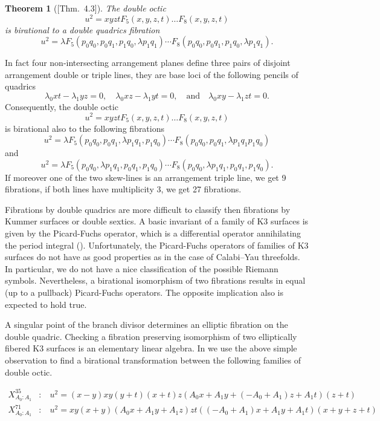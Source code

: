 \documentclass[12pt]{amsart}
\theoremstyle{plain}
\newtheorem{theorem}{Theorem}[section]
\theoremstyle{remark}
\theoremstyle{definition}
\numberwithin{table}{section}
\begin{document}
\begin{theorem}[\mbox{\cite{CK-C2}[Thm.~4.3]}]
	The double octic
	\[u^{2} = xyztF_{5}(x,y,z,t)\dots F_{8}(x,y,z,t)\]
	is birational to a double quadrics fibration
	\[u^{2} = \lambda F_{5}(p_{0}q_{0}, p_{0}q_{1}, p_{1}q_{0}, \lambda p_{1}q_{1}) \cdots F_{8}(p_{0}q_{0}, p_{0}q_{1}, p_{1}q_{0}, \lambda p_{1}q_{1}).\]
\end{theorem}
In fact four non-intersecting arrangement planes define three pairs of disjoint arrangement double or triple lines, they are base loci of the following pencils of quadrics
\[\lambda_{0}xt-\lambda_{1}yz=0, \quad \lambda_{0}xz-\lambda_{1}yt=0, \quad\text{and} \quad \lambda_{0}xy-\lambda_{1}zt=0.\]
Consequently, the double octic
	\[u^{2} = xyztF_{5}(x,y,z,t)\dots F_{8}(x,y,z,t)\]
is birational also to the following fibrations
\[u^{2} = \lambda F_{5}(p_{0}q_{0}, p_{0}q_{1}, \lambda p_{1}q_{1}, p_{1}q_{0}) \cdots F_{8}(p_{0}q_{0}, p_{0}q_{1}, \lambda p_{1}q_{1}p_{1}q_{0})\]
and
\[u^{2} = \lambda F_{5}(p_{0}q_{0}, \lambda p_{1}q_{1}, p_{0}q_{1}, p_{1}q_{0}) \cdots F_{8}(p_{0}q_{0}, \lambda p_{1}q_{1}, p_{0}q_{1}, p_{1}q_{0}).\]
If moreover one of the two skew-lines is an arrangement triple line, we get 9 fibrations, if both lines have multiplicity 3, we get 27 fibrations.

Fibrations by double quadrics are  more difficult to classify then fibrations by Kummer surfaces or double sextics. A basic invariant of a family of K3 surfaces is given by the Picard-Fuchs operator, which is a differential operator annihilating the period integral (\cite{CvS}). Unfortunately, the Picard-Fuchs operators of families of K3 surfaces do not have as good properties as in the case of Calabi--Yau threefolds. In particular, we do not have a nice classification of the possible Riemann symbols. Nevertheless, a birational isomorphism of two fibrations results in equal (up to a pullback) Picard-Fuchs operators. The opposite implication also is expected to hold true.

A singular point of the branch divisor determines an elliptic fibration on the double quadric. Checking a fibration preserving isomorphism of two elliptically fibered K3 surfaces is an elementary linear algebra.
In \cite{CK-C2} we use the above simple observation to find a birational transformation between the following families of double octic.

        \begin{eqnarray*}
	X^{35}_{A_{0}:A_{1}}&:&\
	u^{2}=(x - y)xy(y + t)(x + t)z\left(A_{0}x + A_{1}y + (-A_{0} + A_{1})z + A_{1}t\right)(z + t)\\
	X^{71}_{A_{0}:A_{1}}&:&\
	u^{2}=xy(x + y)\left(A_{0}x + A_{1}y + A_{1}z\right)zt
	\left((-A_{0} + A_{1})x + A_{1}y + A_{1}t\right)(x + y + z + t)
\end{eqnarray*}
\end{document}
